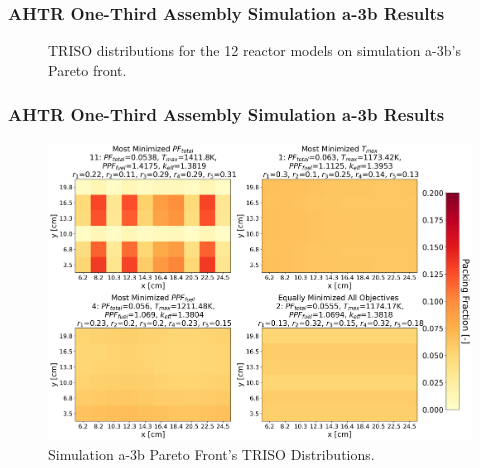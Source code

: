 \begin{frame}
    \frametitle{AHTR One-Third Assembly Simulation a-3b Results}
    \begin{figure}
        \caption{TRISO distributions for the 12 reactor models on simulation 
        a-3b's Pareto front.}
    \end{figure}
\end{frame}

\begin{frame}
    \frametitle{AHTR One-Third Assembly Simulation a-3b Results}
    \begin{figure}
        \includegraphics[width=0.8\linewidth]{../docs/figures/assem-obj-3-all-distr-most-minimized.png} 
        \caption{Simulation a-3b Pareto Front's TRISO Distributions.}
    \end{figure}
\end{frame}

